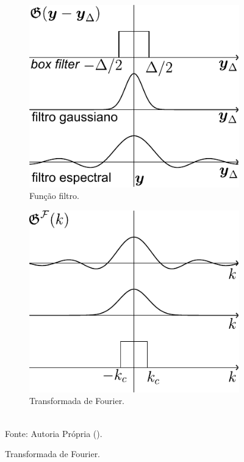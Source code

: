 \begin{figure}[h!]
    \centering
    \caption{Comportamento dos filtros apresentados na Tabela \ref{tab:filters}.}
    \begin{subfigure}{0.4\textwidth}
        \includegraphics[width=\linewidth]{Figuras/filtros1.pdf}
        \caption{Função filtro.}
    \end{subfigure}
    \begin{subfigure}{0.4\textwidth}
        \includegraphics[width=\linewidth]{Figuras/filtros2.pdf}
        \caption{Transformada de Fourier.}
    \end{subfigure}
    \\Fonte: Autoria Própria (\the\year).
    \label{fig:Filters}
\end{figure}

